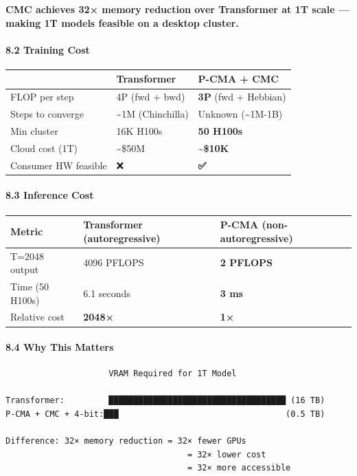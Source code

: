 \documentclass[
  11pt,
  a4paper,
]{article}
\begin{document}
\textbf{CMC achieves 32× memory reduction over Transformer at 1T scale
--- making 1T models feasible on a desktop cluster.}

\paragraph{8.2 Training Cost}\label{training-cost}

\begin{longtable}[]{@{}lll@{}}
\toprule\noalign{}
& Transformer & P-CMA + CMC \\
\midrule\noalign{}
\endhead
\bottomrule\noalign{}
\endlastfoot
FLOP per step & 4P (fwd + bwd) & \textbf{3P} (fwd + Hebbian) \\
Steps to converge & \textasciitilde1M (Chinchilla) & Unknown
(\textasciitilde1M-1B) \\
Min cluster & 16K H100s & \textbf{50 H100s} \\
Cloud cost (1T) & \textasciitilde\$50M &
\textbf{\textasciitilde\$10K} \\
Consumer HW feasible & ❌ & \textbf{✅} \\
\end{longtable}

\paragraph{8.3 Inference Cost}\label{inference-cost}

\begin{longtable}[]{@{}lll@{}}
\toprule\noalign{}
Metric & Transformer (autoregressive) & P-CMA (non-autoregressive) \\
\midrule\noalign{}
\endhead
\bottomrule\noalign{}
\endlastfoot
T=2048 output & 4096 PFLOPS & \textbf{2 PFLOPS} \\
Time (50 H100s) & 6.1 seconds & \textbf{3 ms} \\
Relative cost & \textbf{2048×} & \textbf{1×} \\
\end{longtable}

\paragraph{8.4 Why This Matters}\label{why-this-matters}

\begin{verbatim}
                     VRAM Required for 1T Model
                     
Transformer:         ████████████████████████████████████ (16 TB)
P-CMA + CMC + 4-bit:███                                  (0.5 TB)

Difference: 32× memory reduction = 32× fewer GPUs
                                     = 32× lower cost
                                     = 32× more accessible
\end{verbatim}
\end{document}
